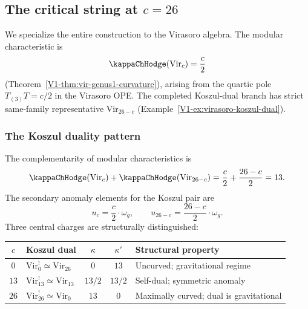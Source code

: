 %
%

\subsection{The critical string at $c = 26$}

We specialize the entire construction to the Virasoro algebra.
The modular characteristic is
\begin{equation}%
\kappaChHodge(\mathrm{Vir}_c) = \frac{c}{2}
\end{equation}
(Theorem~\ref{V1-thm:vir-genus1-curvature}), arising from the quartic
pole $T_{(3)}T = c/2$ in the Virasoro OPE. The completed
Koszul-dual branch has strict same-family representative
$\mathrm{Vir}_{26-c}$
(Example~\ref{V1-ex:virasoro-koszul-dual}).

\subsubsection{The Koszul duality pattern}

The complementarity of modular characteristics is
\begin{equation}%
\kappaChHodge(\mathrm{Vir}_c) + \kappaChHodge(\mathrm{Vir}_{26-c})
= \frac{c}{2} + \frac{26-c}{2} = 13.
\end{equation}
The secondary anomaly elements for the Koszul pair are
\begin{equation}%
u_c = \frac{c}{2} \cdot \omega_g,
\qquad
u_{26-c} = \frac{26-c}{2} \cdot \omega_g.
\end{equation}
Three central charges are structurally distinguished:

\begin{center}
\renewcommand{\arraystretch}{1.4}
\begin{tabular}{clccl}
\toprule
$c$ & Koszul dual & $\kappa$ & $\kappa'$ & Structural property \\
\midrule
$0$ & $\mathrm{Vir}_0^! \simeq \mathrm{Vir}_{26}$ & $0$ & $13$ &
 Uncurved; gravitational regime \\
$13$ & $\mathrm{Vir}_{13}^! \simeq \mathrm{Vir}_{13}$ & $13/2$ & $13/2$ &
 Self-dual; symmetric anomaly \\
$26$ & $\mathrm{Vir}_{26}^! \simeq \mathrm{Vir}_0$ & $13$ & $0$ &
 Maximally curved; dual is gravitational \\
\bottomrule
\end{tabular}
\end{center}

